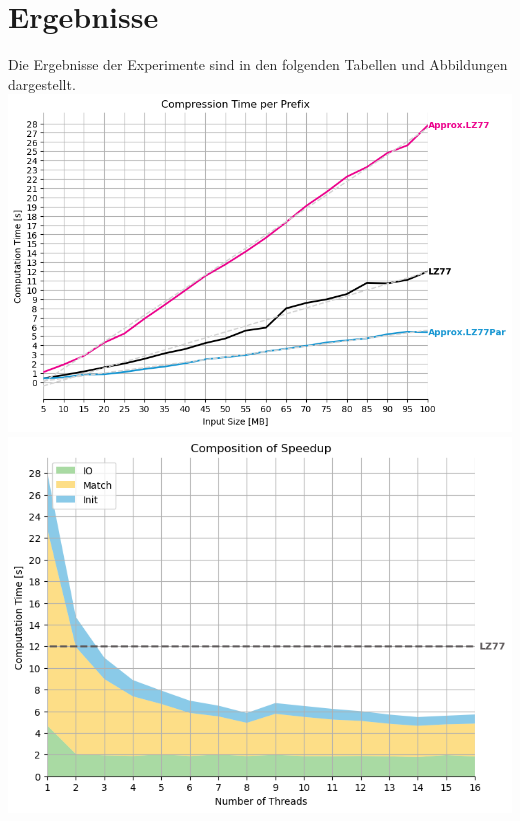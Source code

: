 \section{Ergebnisse}
Die Ergebnisse der Experimente sind in den folgenden Tabellen und Abbildungen dargestellt.\\
\includegraphics[scale = 0.65]{bilder/progressive.png}\\
\includegraphics[scale = 0.65]{bilder/progressive_speedup_stack.png}